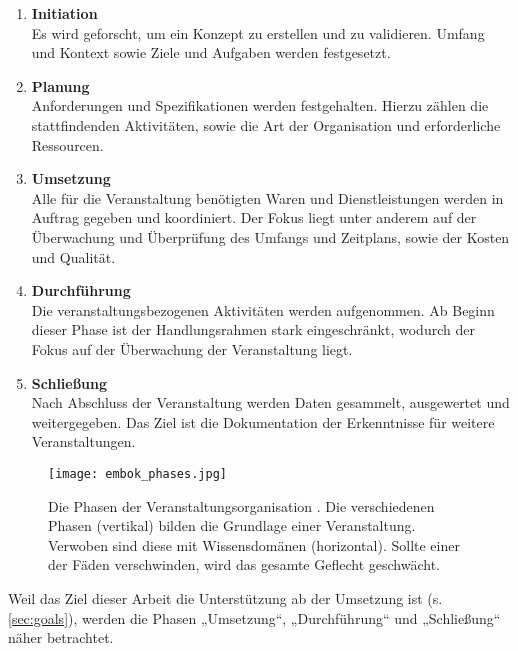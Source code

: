\begin{enumerate}
    \setlength{\itemsep}{1em}
    \item \textbf{Initiation} \\
          Es wird geforscht, um ein Konzept zu erstellen und zu validieren.
          Umfang und Kontext sowie Ziele und Aufgaben werden festgesetzt.
    \item \textbf{Planung} \\
          Anforderungen und Spezifikationen werden festgehalten. Hierzu zählen
          die stattfindenden Aktivitäten, sowie die Art der Organisation und
          erforderliche Ressourcen.
    \item \textbf{Umsetzung} \\
          Alle für die Veranstaltung benötigten Waren und Dienstleistungen
          werden in Auftrag gegeben und koordiniert. Der Fokus liegt unter
          anderem auf der Überwachung und Überprüfung des Umfangs und Zeitplans,
          sowie der Kosten und Qualität.
    \item \textbf{Durchführung} \\
          Die veranstaltungsbezogenen Aktivitäten werden aufgenommen. Ab Beginn
          dieser Phase ist der Handlungsrahmen stark eingeschränkt, wodurch der
          Fokus auf der Überwachung der Veranstaltung liegt.
    \item \textbf{Schließung} \\
          Nach Abschluss der Veranstaltung werden Daten gesammelt, ausgewertet
          und weitergegeben. Das Ziel ist die Dokumentation der Erkenntnisse für
          weitere Veranstaltungen.
\end{enumerate}

\begin{figure}[htpb]
    \centering
    \texttt{[image: embok\_phases.jpg]}
    \caption{Die Phasen der Veranstaltungsorganisation \cite{Silvers2013b}. Die
        verschiedenen Phasen (vertikal) bilden die Grundlage einer
        Veranstaltung. Verwoben sind diese mit Wissensdomänen (horizontal).
        Sollte einer der Fäden verschwinden, wird das gesamte Geflecht
        geschwächt.}
    \label{fig:embok-phases}
\end{figure}


Weil das Ziel dieser Arbeit die Unterstützung ab der Umsetzung ist (s.
\autoref{sec:goals}), werden die Phasen „Umsetzung“, „Durchführung“ und
„Schließung“ näher betrachtet.

